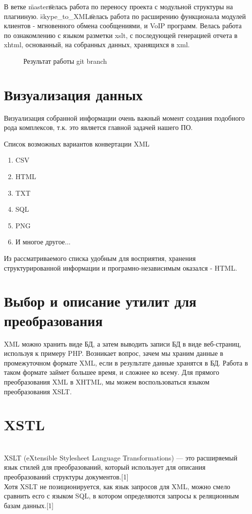  В ветке \"master\" велась работа по переносу проекта с модульной структуры на плагииную. \"skype_to_XML\" велась работа по расширению функционала модулей клиентов - мгновенного обмена сообщениями, и VoIP программ. Велась работа по ознакомлению с языком разметки xslt, с последующей генерацией отчета в xhtml, основанный, на собранных данных, хранящихся в xml.

\begin{figure}[h]
\caption{Результат работы git branch}
\label{pic:branch_project}
\end{figure}

\chapter*{Визуализация данных}
Визуализация собранной информации очень важный момент создания подобного рода комплексов, т.к. это является главной задачей нашего ПО. 

Список возможных вариантов конвертации XML
\begin{enumerate}
\item CSV
\item HTML
\item TXT
\item SQL

\item PNG
\item И многое другое...
\end{enumerate}
Из рассматриваемого списка удобным для восприятия, хранения структурированной информации и 
програмно-независимым%
оказался - HTML.
\chapter*{Выбор и описание утилит для преобразования}

XML можно хранить виде БД, а затем выводить записи БД в виде веб-страниц, используя к примеру PHP. Возникает вопрос, зачем мы храним данные в промежуточном формате XML, если в результате данные хранятся в БД. Работа в таком формате займет большее время, и сложнее ко всему. Для прямого преобразования XML в XHTML, мы можем воспользоваться языком преобразования XSLT. 
\chapter*{XSTL}
\\XSLT (eXtensible Stylesheet Language Transformations) — это расширяемый язык стилей для преобразований, который использует для описания преобразований структуры документов.[1]
\\Хотя XSLT не позиционируется, как язык запросов для XML, можно смело сравнить есго с языком SQL, в котором определяются запросы к реляционным базам данных.[1]

